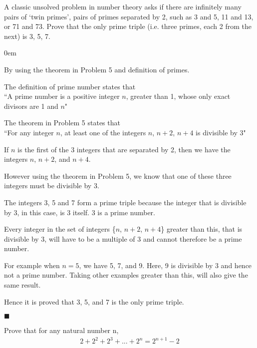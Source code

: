 \documentclass[12pt]{article}
\renewcommand{\qed}{\hfill$\blacksquare$}
\renewenvironment{proof}{\begin{addmargin}[1em]{0em}\begin{newproof}}{\end{newproof}\end{addmargin}\qed}
\newenvironment{problem}[2][Problem]{\begin{trivlist}
\item[\hskip \labelsep {\bfseries #1}\hskip \labelsep {\bfseries #2.}]}{\end{trivlist}}
\begin{document}
\pagebreak


\begin{problem}{6}
    A classic unsolved problem in number theory asks if there are infinitely many pairs of ‘twin primes’, pairs of primes separated by 2, such as 3 and 5, 11 and 13, or 71 and 73. Prove that the only prime triple (i.e. three primes, each 2 from the next) is 3, 5, 7.
\end{problem}

\begin{proof}
By using the theorem in Problem 5 and definition of primes.

\hfill \break
The definition of prime number states that \\
``A prime number is a positive integer $n$, greater than 1, whose only exact divisors are 1 and $n$"

The theorem in Problem 5 states that \\
``For any integer $n$, at least one of the integers $n$, $n + 2$, $n + 4$ is divisible by 3"

\hfill \break
If $n$ is the first of the 3 integers that are separated by 2, then we have the integers $n$, $n + 2$, and $n + 4$.

However using the theorem in Problem 5, we know that one of these three integers must be divisible by 3.

The integers 3, 5 and 7 form a prime triple because the integer that is divisible by 3, in this case, is 3 itself. 3 is a prime number. 

Every integer in the set of integers \{$n$, $n + 2$, $n + 4$\} greater than this, that is divisible by 3, will have to be a multiple of 3 and cannot therefore be a prime number.

For example when $n=5$, we have 5, 7, and 9. Here, 9 is divisible by 3 and hence not a prime number. Taking other examples greater than this, will also give the same result.

\hfill \break
Hence it is proved that 3, 5, and 7 is the only prime triple.
\end{proof}

\pagebreak


\begin{problem}{7}
    Prove that for any natural number n,
    \begin{align*}
        2+2^2 +2^3 + ... + 2^n = 2^{n+1} - 2
    \end{align*}
\end{problem}
\end{document}
